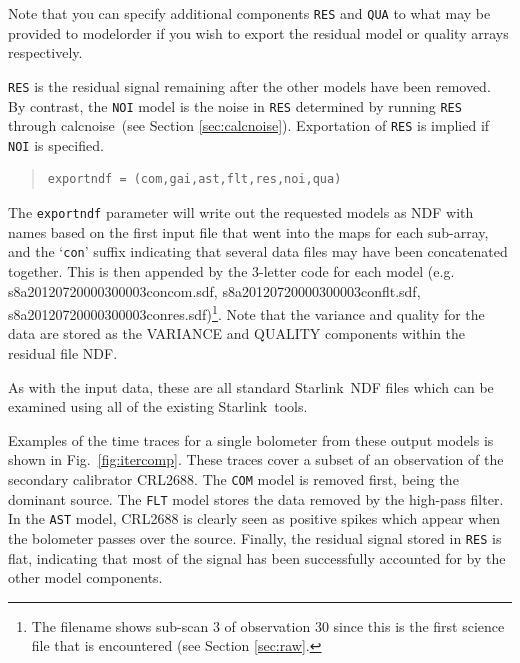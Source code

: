 \documentclass[twoside,11pt]{article}
\newcommand{\htmladdnormallink}[2]{#1}
\newcommand{\xref}[3]{#1}
\renewcommand{\_}{\texttt{\symbol{95}}}
\newenvironment{myquote}{\begin{quote}\begin{small}}{\end{small}\end{quote}}
\newcommand{\starlink}{\htmladdnormallink{Starlink}{http://starlink.jach.hawaii.edu}}
\newcommand{\task}[1]{\textsf{#1}}
\newcommand{\calcnoise}{\xref{\task{calcnoise}}{sun258}{CALCNOISE}}
\begin{document}
Note that you can specify additional components \texttt{RES} and \texttt{QUA} to what may be provided to modelorder if you wish to export the residual model or quality arrays respectively. 

\texttt{RES} is the residual signal remaining after the other models have been removed. By contrast, the \texttt{NOI} model is the noise in \texttt{RES} determined by running \texttt{RES} through \calcnoise\ (see Section \ref{sec:calcnoise}). Exportation of \texttt{RES} is implied if \texttt{NOI} is specified.
\vspace{0cm}
\begin{myquote}
\begin{verbatim}
exportndf = (com,gai,ast,flt,res,noi,qua)
\end{verbatim}
\end{myquote}
\vspace{0cm}
The \texttt{exportndf} parameter will write out the requested models as NDF with names based on the first input file that went into the maps for each sub-array, and the `\texttt{con}' suffix indicating that several
data files may have been concatenated together. This is then appended by the 3-letter  code for each model (e.g. s8a20120720\_00030\_0003\_con\_com.sdf, s8a20120720\_00030\_0003\_con\_flt.sdf, s8a20120720\_00030\_0003\_con\_res.sdf)\footnote{The filename shows sub-scan 3 of observation 30 since this is the first science file that is encountered (see Section \ref{sec:raw}.}. Note that the variance and quality for the data are stored as the VARIANCE and QUALITY components within the residual file NDF.

As with the input data, these are all standard \starlink\ NDF files which can be examined using all of the existing \starlink\ tools.

Examples of the time traces for a single bolometer from these output models is shown in Fig.~\ref{fig:itercomp}.  These traces cover a subset of an observation of the secondary calibrator CRL2688. The \texttt{COM} model is removed first, being the dominant source. The  \texttt{FLT} model stores the data removed by the high-pass filter. In the \texttt{AST} model, CRL2688 is clearly seen as positive spikes which appear when the bolometer passes over the source. Finally, the residual signal stored in \texttt{RES} is flat, indicating that most of the signal has been successfully accounted for by the other model components.
\end{document}
